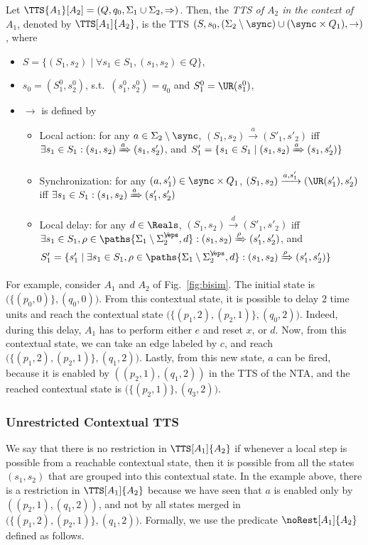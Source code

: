 \documentclass{LMCS}
\theoremstyle{plain}\newtheorem*{prop11}{Proposition~\ref{prop:states} bis}
\begin{document}
\begin{defi}
Let \mbox{$\TTS{A_1}[A_2]=(Q, q_0, \Sigma_1\cup\Sigma_2, {\Rightarrow})$}.
Then, the \emph{TTS of $A_2$ in the context of $A_1$}, denoted by
$\TTS[A_1]{A_2}$, is the TTS
$(S,s_0,(\Sigma_2\setminus\sync)\cup(\sync\times Q_1),{\rightarrow})$, where
\begin{itemize}
  \item $S=\{(S_1,s_2)\mid \forall s_1\in S_1,
  (s_1,s_2)\in Q\}$, \item $s_0=(S_1^0,s_2^0)$, s.t.\ $(s_1^0,s_2^0)=q_0$ and
  $S_1^0=\UR(s_1^0)$,
  \item ${\rightarrow}$ is defined by
  \begin{itemize}
    \item Local action: for any $a\in\Sigma_2\setminus\sync$,
    $(S_1,s_2)\xrightarrow{a}(S'_1,s'_2)$
    iff $\exists s_1\in S_1: (s_1,s_2)\xRightarrow{a}(s_1,s'_2)$,
    and $S'_1=\{s_1\in S_1\mid(s_1,s_2)\xRightarrow{a}(s_1,s'_2)\}$
\item Synchronization: for any $(a,s'_1)\in\sync\times Q_1$,
    $(S_1,s_2)\xrightarrow{a,s'_1}(\UR(s'_1),s'_2)$
    iff $\exists s_1\in S_1: (s_1,s_2)\xRightarrow{a}(s'_1,s'_2)$
\item Local delay: for any $d\in\Reals$,
    $(S_1,s_2)\xrightarrow{d}(S'_1,s'_2)$
    iff $\exists s_1\in S_1, \rho\in \paths{\Sigma_1\setminus\Sigma_{2}^{\not\eps},d}:
    (s_1,s_2)\xRightarrow{\rho}(s'_1,s'_2)$, and  $S'_1=\{s'_1\mid
    \exists s_1\in S_1, \rho\in \paths{\Sigma_1\setminus\Sigma_{2}^{\not\eps},d}:
    (s_1,s_2)\xRightarrow{\rho}(s'_1,s'_2)\}$
\end{itemize}
\end{itemize}
\end{defi}

\noindent For example, consider $A_1$ and $A_2$ of Fig.~\ref{fig:bisim}. The initial
state is $\big(\{(p_{0},0)\},(q_{0},0)\big)$. From this contextual
state, it is possible to delay $2$ time units and reach the contextual
state $\big(\{(p_{1},2),(p_{2},1)\},(q_{0},2)\big)$. Indeed,
during this delay, $A_1$ has to perform either $e$ and reset $x$, or
$d$. Now, from this contextual state, we can take an edge labeled by $c$,
and reach $\big(\{(p_{1},2),(p_{2},1)\},(q_{1},2)\big)$. Lastly,
from this new state, $a$ can be fired, because it is enabled by
$((p_{2},1),(q_{1},2))$ in the TTS of the NTA, and the reached
contextual state is $\big(\{(p_{2},1)\},(q_{3},2)\big)$.




\subsubsection*{Unrestricted Contextual TTS}
We say that there is no restriction in $\TTS[A_1]{A_2}$ if whenever a local
step is possible from a reachable contextual state, then it is possible from all
the states $(s_1,s_2)$ that are grouped into this contextual state.
In the example above, there is a restriction in $\TTS[A_1]{A_2}$ because
we have seen that $a$ is enabled only by $((p_{2},1),(q_{1},2))$,
and not by all states merged in
$\big(\{(p_{1},2),(p_{2},1)\},(q_{1},2)\big)$.
Formally, we use the predicate $\noRest[A_1]{A_2}$ defined as follows.
\end{document}
